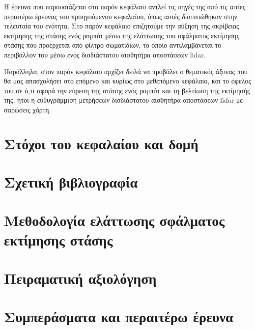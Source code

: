 Η έρευνα που παρουσιάζεται στο παρόν κεφάλαιο αντλεί τις πηγές της από τις
αιτίες περαιτέρω έρευνας του προηγούμενου κεφαλαίου, όπως αυτές διατυπώθηκαν
στην τελευταία του ενότητα. Στο παρόν κεφάλαιο επιζητούμε την αύξηση της
ακρίβειας εκτίμησης της στάσης ενός ρομπότ μέσω της ελάττωσης του σφάλματος
εκτίμησης στάσης που προέρχεται από φίλτρο σωματιδίων, το οποίο αντιλαμβάνεται
το περιβάλλον του μέσω ενός δισδιάστατου αισθητήρα αποστάσεων lidar.

Παράλληλα, στον παρόν κεφάλαιο αρχίζει δειλά να προβάλει ο θεματικός άξονας που
θα μας απασχολήσει στο επόμενο και κυρίως στο μεθεπόμενο κεφάλαιο, και το όφελος
του σε ό,τι αφορά την εύρεση της στάσης ενός ρομπότ και τη βελτίωση της
εκτίμησής της, ήτοι η ευθυγράμμιση μετρήσεων δισδιάστατου αισθητήρα αποστάσεων
lidar με σαρώσεις χάρτη.

\section{Στόχοι του κεφαλαίου και δομή}
  \label{section:02_02_01}
  

\section{Σχετική βιβλιογραφία}
  \label{section:02_02_02}
  

\section{Μεθοδολογία ελάττωσης σφάλματος εκτίμησης στάσης}
  \label{section:02_02_03}
  

\section{Πειραματική αξιολόγηση}
  \label{section:02_02_04}
  

\section{Συμπεράσματα και περαιτέρω έρευνα}
  \label{section:02_02_05}
  
